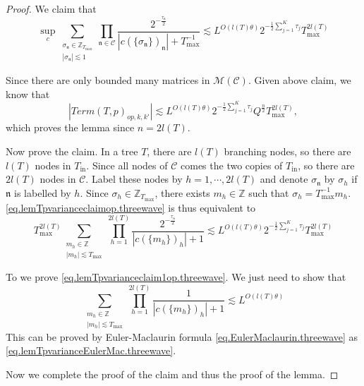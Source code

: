 \begin{proof}
We claim that 
\begin{equation}\label{eq.lemTpvarianceclaimop.threewave}
     \sup_{c}\sum_{\substack{\sigma_{\mathfrak{n}}\in \mathbb{Z}_{T_{\text{max}}}\\ |\sigma_{\mathfrak{n}}|\lesssim 1}} \prod_{\mathfrak{n}\in \mathcal{C}}\frac{2^{-\frac{\tau_{\mathfrak{n}}}{2}}}{|c(\{\sigma_{\mathfrak{n}}\})_{\mathfrak{n}}|+T^{-1}_{\text{max}}}\lesssim L^{O(l(T)\theta)}2^{-\frac{1}{2}\sum_{j=1}^K \tau_{j}} T^{2l(T)}_{\text{max}}
\end{equation}

Since there are only bounded many matrices in $\mathscr{M}(\mathcal{C})$.  Given above claim, we know that 
\begin{equation}
    |Term(T, p)_{op,k,k'}|\lesssim L^{O(l(T)\theta)} 2^{-\frac{1}{2}\sum_{j=1}^K \tau_{j}} Q^{\frac{n}{2}} T^{2l(T)}_{\text{max}},
\end{equation}
which proves the lemma since $n=2l(T)$.

Now prove the claim. In a tree $T$, there are $l(T)$ branching nodes, so there are $l(T)$ nodes in $T_{\text{in}}$. Since all nodes of $\mathcal{C}$ comes the two copies of $T_{\text{in}}$, so there are $2l(T)$ nodes in $\mathcal{C}$. Label these nodes by $h=1,\cdots,2l(T)$ and denote $\sigma_{\mathfrak{n}}$ by $\sigma_{h}$ if $\mathfrak{n}$ is labelled by $h$. Since $\sigma_{h}\in \mathbb{Z}_{T_{\text{max}}}$, there exists $m_{h}\in \mathbb{Z}$ such that $\sigma_{h}=T^{-1}_{\text{max}} m_{h}$. \eqref{eq.lemTpvarianceclaimop.threewave} is thus equivalent to 
\begin{equation}\label{eq.lemTpvarianceclaim1op.threewave}
    T^{2l(T)}_{\text{max}}\sum_{\substack{m_{h}\in \mathbb{Z}\\ |m_{h}|\lesssim T_{\text{max}}}} \prod_{h=1}^{2l(T)}\frac{2^{-\frac{\tau_{\mathfrak{n}}}{2}}}{|c(\{m_{h}\})_{h}|+1}\lesssim L^{O(l(T)\theta)}2^{-\frac{1}{2}\sum_{j=1}^K \tau_{j}} T^{2l(T)}_{\text{max}}
\end{equation}

To we prove \eqref{eq.lemTpvarianceclaim1op.threewave}. We just need to show that 
\begin{equation}
    \sum_{\substack{m_{h}\in \mathbb{Z}\\ |m_{h}|\lesssim T_{\text{max}}}} \prod_{h=1}^{2l(T)}\frac{1}{|c(\{m_{h}\})_{h}|+1}\lesssim L^{O(l(T)\theta)}
\end{equation}
This can be proved by Euler-Maclaurin formula \eqref{eq.EulerMaclaurin.threewave} as \eqref{eq.lemTpvarianceEulerMac.threewave}.

Now we complete the proof of the claim and thus the proof of the lemma.
\end{proof}


